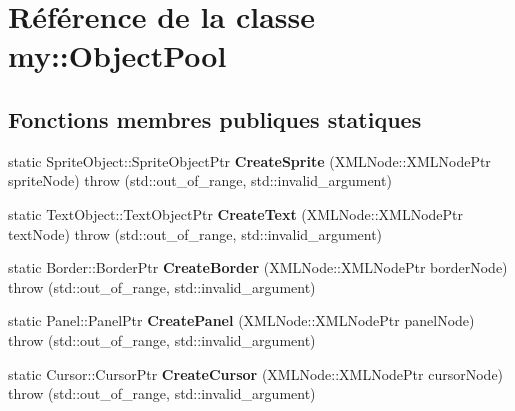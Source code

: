 \hypertarget{classmy_1_1ObjectPool}{}\section{Référence de la classe my\+:\+:Object\+Pool}
\label{classmy_1_1ObjectPool}
\subsection*{Fonctions membres publiques statiques}
\begin{DoxyCompactItemize}
\item 
\mbox{\label{classmy_1_1ObjectPool_a998c84ca9082a40422a96c83c928af4a}} 
static Sprite\+Object\+::\+Sprite\+Object\+Ptr {\bfseries Create\+Sprite} (X\+M\+L\+Node\+::\+X\+M\+L\+Node\+Ptr sprite\+Node)  throw (std\+::out\+\_\+of\+\_\+range, std\+::invalid\+\_\+argument)
\item 
\mbox{\label{classmy_1_1ObjectPool_a8795fd18ec08dcdb060095126843764e}} 
static Text\+Object\+::\+Text\+Object\+Ptr {\bfseries Create\+Text} (X\+M\+L\+Node\+::\+X\+M\+L\+Node\+Ptr text\+Node)  throw (std\+::out\+\_\+of\+\_\+range, std\+::invalid\+\_\+argument)
\item 
\mbox{\label{classmy_1_1ObjectPool_a6aee2d2951142a5691fc9ef33f3c8c47}} 
static Border\+::\+Border\+Ptr {\bfseries Create\+Border} (X\+M\+L\+Node\+::\+X\+M\+L\+Node\+Ptr border\+Node)  throw (std\+::out\+\_\+of\+\_\+range, std\+::invalid\+\_\+argument)
\item 
\mbox{\label{classmy_1_1ObjectPool_ae05dd9c86ea759f3a8593c5330e23786}} 
static Panel\+::\+Panel\+Ptr {\bfseries Create\+Panel} (X\+M\+L\+Node\+::\+X\+M\+L\+Node\+Ptr panel\+Node)  throw (std\+::out\+\_\+of\+\_\+range, std\+::invalid\+\_\+argument)
\item 
\mbox{\label{classmy_1_1ObjectPool_a63ddc3d83766c1d3dbbe1120ce335abe}} 
static Cursor\+::\+Cursor\+Ptr {\bfseries Create\+Cursor} (X\+M\+L\+Node\+::\+X\+M\+L\+Node\+Ptr cursor\+Node)  throw (std\+::out\+\_\+of\+\_\+range, std\+::invalid\+\_\+argument)
\item 
\mbox{\label{classmy_1_1ObjectPool_a7e8e80d52717c9b972b16007ed73658a}} 

\end{DoxyCompactItemize}
